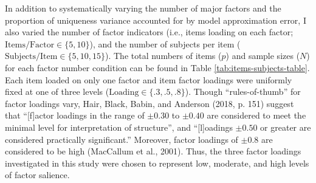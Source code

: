 \documentclass[
  english,
  man]{apa6}
\begin{document}
In addition to systematically varying the number of major factors and the proportion of uniqueness variance accounted for by model approximation error, I also varied the number of factor indicators (i.e., items loading on each factor; \(\textrm{Items/Factor} \in \{5, 10 \}\)), and the number of subjects per item (\(\textrm{Subjects/Item} \in \{ 5, 10, 15\}\)). The total numbers of items (\(p\)) and sample sizes (\(N\)) for each factor number condition can be found in Table \ref{tab:items-subjects-table}. Each item loaded on only one factor and item factor loadings were uniformly fixed at one of three levels (\(\textrm{Loading} \in \{ .3, .5, .8 \}\)). Though \enquote{rules-of-thumb} for factor loadings vary, Hair, Black, Babin, and Anderson (2018, p. 151) suggest that \enquote{{[}f{]}actor loadings in the range of \(\pm 0.30\) to \(\pm 0.40\) are considered to meet the minimal level for interpretation of structure}, and \enquote{{[}l{]}oadings \(\pm 0.50\) or greater are considered practically significant.} Moreover, factor loadings of \(\pm 0.8\) are considered to be high (MacCallum et al., 2001). Thus, the three factor loadings investigated in this study were chosen to represent low, moderate, and high levels of factor salience.
\end{document}
